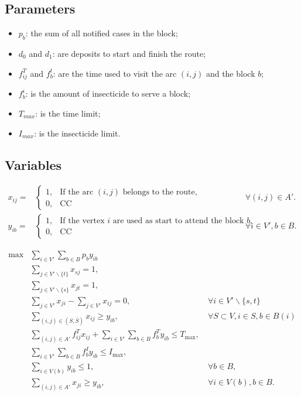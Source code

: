 \documentclass[a4paper,11pt]{article}
\begin{document}
\subsection{Parameters}
\begin{itemize}
    \item $p_b$: the sum of all notified cases in the block;
    \item $d_0$ and $d_1$: are deposits to start and finish the route;
    \item $f^T_{ij}$ and $f^t_{b}$: are the time used to visit the arc $(i, j)$ and the block $b$;
    \item $f^i_{b}$: is the amount of insecticide to serve a block;
    \item $T_{max}$: is the time limit;
    \item $I_{max}$: is the insecticide limit.
\end{itemize}


\subsection{Variables}

\begin{align}
  \nonumber x_{ij} = & \begin{cases}
                         1, & \text{If the arc $(i, j)$ belongs to the route,} \\
                         0, & \text{CC} 
                       \end{cases} & \forall (i, j) \in A'. \\
  \nonumber y_{ib} = & \begin{cases}
                         1, & \text{If the vertex $i$ are used as start to attend the block $b$,} \\
                         0, & \text{CC} 
                       \end{cases} & \forall i \in V', b \in B.
\end{align}


\begin{align}
  \max & \sum_{i \in V'} \sum_{b \in B} p_b y_{ib} & \\
       & \sum_{j \in V'\backslash \{t\}} x_{sj} = 1, & \\
       & \sum_{j \in V'\backslash \{s\}} x_{jt} = 1, & \\
       & \sum_{j \in V'} x_{ji} - \sum_{j \in V'} x_{ij} = 0, & \ \forall i \in V' \backslash \{s, t\} \\
       & \sum_{(i, j) \in (S, \bar{S})} x_{ij} \geq y_{ib}, & \ \forall S \subset V, i \in S, b \in B(i) \\
       & \sum_{(i, j) \in A'} f^T_{ij} x_{ij} + \sum_{i \in V'} \sum_{b \in B} f^T_b y_{ib} \leq T_{\max}, & \\
       & \sum_{i \in V'} \sum_{b \in B} f^I_b y_{ib} \leq I_{\max}, & \\
       & \sum_{i \in V(b)} y_{ib} \leq 1, & \ \forall b \in B, \\
       & \sum_{(i, j) \in A'} x_{ji} \geq y_{ib}, & \ \forall i \in V(b), b \in B.
\end{align}
\end{document}

